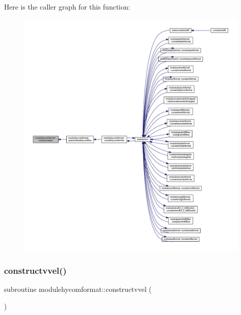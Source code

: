 Here is the caller graph for this function\+:\nopagebreak
\begin{figure}[H]
\begin{center}
\leavevmode
\includegraphics[width=350pt]{namespacemodulehycomformat_a26be9ece61892ddfd2166afbb12b8b28_icgraph}
\end{center}
\end{figure}
\mbox{\label{namespacemodulehycomformat_aab97b75b8e514c72a0dbade3a8884e90}} 
\subsubsection{\texorpdfstring{constructvvel()}{constructvvel()}}
{\footnotesize\ttfamily subroutine modulehycomformat\+::constructvvel (\begin{DoxyParamCaption}{ }\end{DoxyParamCaption})\hspace{0.3cm}{\ttfamily [private]}}

